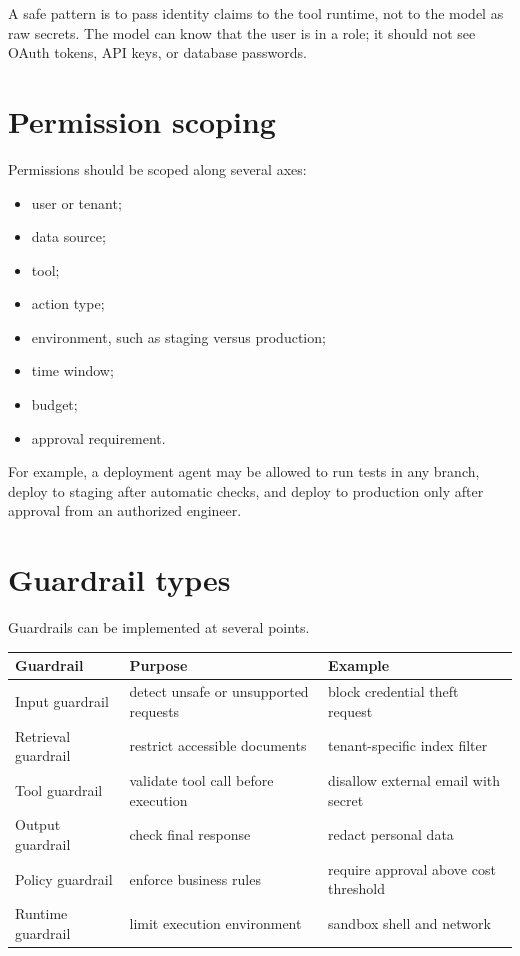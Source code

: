 A safe pattern is to pass identity claims to the tool runtime, not to the model as raw secrets. The model can know that the user is in a role; it should not see OAuth tokens, API keys, or database passwords.

\section{Permission scoping}

Permissions should be scoped along several axes:

\begin{itemize}[leftmargin=*]
  \item user or tenant;
  \item data source;
  \item tool;
  \item action type;
  \item environment, such as staging versus production;
  \item time window;
  \item budget;
  \item approval requirement.
\end{itemize}

For example, a deployment agent may be allowed to run tests in any branch, deploy to staging after automatic checks, and deploy to production only after approval from an authorized engineer.

\section{Guardrail types}

Guardrails can be implemented at several points.

\begin{longtable}{p{}p{}p{}}
\toprule
\textbf{Guardrail} & \textbf{Purpose} & \textbf{Example} \\
\midrule
Input guardrail & detect unsafe or unsupported requests & block credential theft request \\
Retrieval guardrail & restrict accessible documents & tenant-specific index filter \\
Tool guardrail & validate tool call before execution & disallow external email with secret \\
Output guardrail & check final response & redact personal data \\
Policy guardrail & enforce business rules & require approval above cost threshold \\
Runtime guardrail & limit execution environment & sandbox shell and network \\
\bottomrule
\end{longtable}

